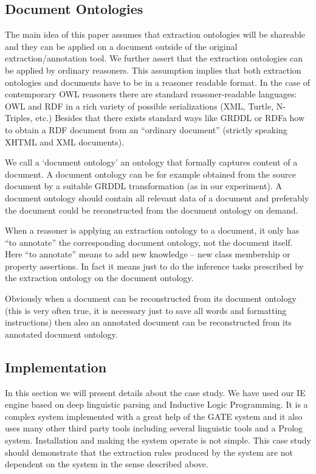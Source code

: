 \subsection{Document Ontologies} \label{sec:doc_ont}

The main idea of this paper assumes that extraction ontologies will be shareable and they can be applied on a document outside of the original extraction/annotation tool. We further assert that the extraction ontologies can be applied by ordinary reasoners. This assumption implies that both extraction ontologies and documents have to be in a reasoner readable format. In the case of contemporary OWL reasoners there are standard reasoner-readable languages: OWL and RDF in a rich variety of possible serializations (XML, Turtle, N-Triples, etc.) Besides that there exists standard ways like GRDDL or RDFa how to obtain a RDF document from an ``ordinary document'' (strictly speaking XHTML and XML documents).

We call a `document ontology' an ontology that formally captures content of a document. A document ontology can be for example obtained from the source document by a suitable GRDDL transformation (as in our experiment). A document ontology should contain all relevant data of a document and preferably the document could be reconstructed from the document ontology on demand.

When a reasoner is applying an extraction ontology to a document, it only has ``to annotate'' the corresponding document ontology, not the document itself. Here ``to annotate'' means to add new knowledge -- new class membership or property assertions. In fact it means just to do the inference tasks prescribed by the extraction ontology on the document ontology. 

Obviously when a document can be reconstructed from its document ontology (this is very often true, it is necessary just to save all words and formatting instructions) then also an annotated document can be reconstructed from its annotated document ontology. 


\subsection{Implementation} \label{sec:implement}

In this section we will present details about the case study.  We have used our IE engine \citep{biblio:DedekISWC2010} based on deep linguistic parsing and Inductive Logic Programming. It is a complex system implemented with a great help of the GATE system \citep{dedek:GATE_ACL2002} and it also uses many other third party tools including several linguistic tools and a Prolog system. Installation and making the system operate is not simple. This case study should demonstrate that the extraction rules produced by the system are not dependent on the system in the sense described above.




